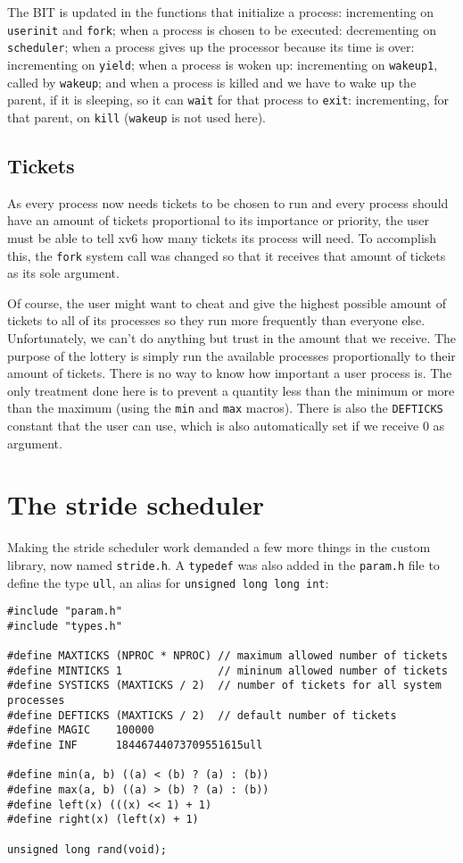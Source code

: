\documentclass[12pt]{article}
\begin{document}
The BIT is updated in the functions that initialize a process: incrementing on \texttt{userinit} and \texttt{fork}; when a process is chosen to be executed: decrementing on \texttt{scheduler}; when a process gives up the processor because its time is over: incrementing on \texttt{yield}; when a process is woken up: incrementing on \texttt{wakeup1}, called by \texttt{wakeup}; and when a process is killed and we have to wake up the parent, if it is sleeping, so it can \texttt{wait} for that process to \texttt{exit}: incrementing, for that parent, on \texttt{kill} (\texttt{wakeup} is not used here).

\subsection{Tickets}
As every process now needs tickets to be chosen to run and every process should have an amount of tickets proportional to its importance or priority, the user must be able to tell xv6 how many tickets its process will need. To accomplish this, the \texttt{fork} system call was changed so that it receives that amount of tickets as its sole argument.

Of course, the user might want to cheat and give the highest possible amount of tickets to all of its processes so they run more frequently than everyone else. Unfortunately, we can't do anything but trust in the amount that we receive. The purpose of the lottery is simply run the available processes proportionally to their amount of tickets. There is no way to know how important a user process is. The only treatment done here is to prevent a quantity less than the minimum or more than the maximum (using the \texttt{min} and \texttt{max} macros). There is also the \texttt{DEFTICKS} constant that the user can use, which is also automatically set if we receive 0 as argument.

\section{The stride scheduler}\label{sec:strsched}
Making the stride scheduler work demanded a few more things in the custom library, now named \texttt{stride.h}. A \texttt{typedef} was also added in the \texttt{param.h} file to define the type \texttt{ull}, an alias for \texttt{unsigned long long int}:

\begin{scriptsize}
\begin{verbatim}
#include "param.h"
#include "types.h"

#define MAXTICKS (NPROC * NPROC) // maximum allowed number of tickets
#define MINTICKS 1               // mininum allowed number of tickets
#define SYSTICKS (MAXTICKS / 2)  // number of tickets for all system processes
#define DEFTICKS (MAXTICKS / 2)  // default number of tickets
#define MAGIC    100000
#define INF      18446744073709551615ull

#define min(a, b) ((a) < (b) ? (a) : (b))
#define max(a, b) ((a) > (b) ? (a) : (b))
#define left(x) (((x) << 1) + 1)
#define right(x) (left(x) + 1)

unsigned long rand(void);
\end{verbatim}
\end{scriptsize}
\end{document}
